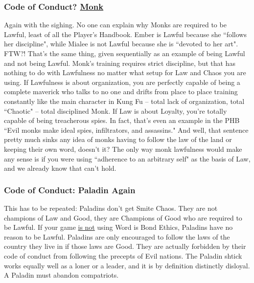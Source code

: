 \subsubsection{Code of Conduct? \hyperref[class:monk]{Monk}}
Again with the sighing. No one can explain why Monks are required to be Lawful, least of all the Player's Handbook. Ember is Lawful because she ``follows her discipline", while Mialee is not Lawful because she is ``devoted to her art". FTW?! That's the same thing, given sequentially as an example of being Lawful and not being Lawful. Monk's training requires strict discipline, but that has nothing to do with Lawfulness no matter what setup for Law and Chaos you are using. If Lawfulness is about organization, you are perfectly capable of being a complete maverick who talks to no one and drifts from place to place training constantly like the main character in Kung Fu -- total lack of organization, total ``Chaotic" -- total disciplined Monk. If Law is about Loyalty, you're totally capable of being treacherous spies. In fact, that's even an example in the PHB ``Evil monks make ideal spies, infiltrators, and assassins." And well, that sentence pretty much sinks any idea of monks having to follow the law of the land or keeping their own word, doesn't it? The only way monk lawfulness would make any sense is if you were using ``adherence to an arbitrary self" as the basis of Law, and we already know that can't hold.

\subsubsection{Code of Conduct: Paladin Again}
This has to be repeated: Paladins don't get Smite Chaos. They are not champions of Law and Good, they are Champions of Good who are required to be Lawful. If your game \underline{is not} using Word is Bond Ethics, Paladins have no reason to be Lawful. Paladins are only encouraged to follow the laws of the country they live in if those laws are Good. They are actually forbidden by their code of conduct from following the precepts of Evil nations. The Paladin shtick works equally well as a loner or a leader, and it is by definition distinctly disloyal. A Paladin must abandon compatriots.
